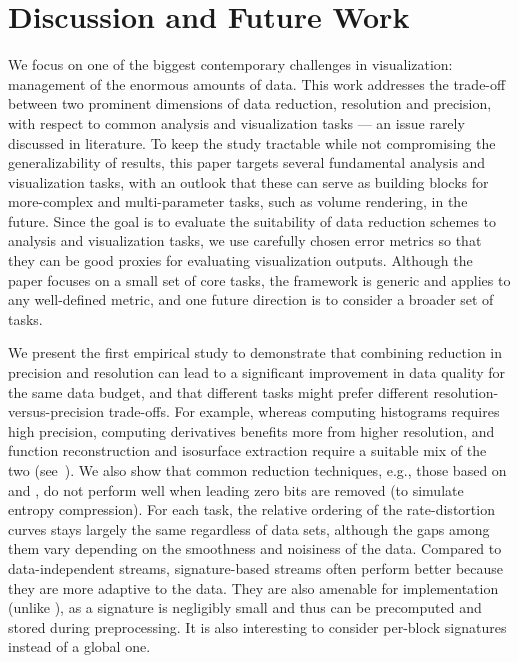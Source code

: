 \section{Discussion and Future Work}

{\color{blue}
We focus on one of the biggest contemporary challenges in visualization: management of 
the enormous amounts of data. This work addresses the trade-off between two prominent 
dimensions of data reduction, resolution and precision, with respect to 
common analysis and visualization tasks --- 
an issue rarely discussed in literature.
To keep the study tractable while not
compromising the generalizability of results, this paper targets 
several fundamental analysis and visualization tasks, with an outlook that these can serve as building blocks 
for more-complex and multi-parameter tasks, such as volume rendering, in the future.
Since the goal is to evaluate the suitability of data reduction schemes to analysis and 
visualization tasks, we use carefully chosen error metrics 
so that they can be good
proxies for evaluating visualization outputs. Although the paper focuses on a small set of core tasks, the framework is generic and applies to any well-defined metric, and one future direction is to
consider a broader set of tasks.}

We present the first empirical study to demonstrate that combining reduction in precision and
resolution can lead to a significant improvement in data quality for the same data budget, and that
different tasks might prefer different resolution-versus-precision trade-offs. For example, whereas
computing histograms requires high precision, computing derivatives benefits more from higher
resolution, and function reconstruction and isosurface extraction require a suitable mix of the two
(see~). We also show that common reduction techniques, e.g., those based on
\slvl and \smag, do not perform well when leading zero bits are removed (to simulate entropy
compression). {\color{red}For each task, the relative ordering of the rate-distortion curves stays
largely the same regardless of data sets, although the gaps among them vary depending on the
smoothness and noisiness of the data. Compared to data-independent streams, signature-based streams
often perform better because they are more adaptive to the data. They are also amenable for
implementation (unlike \sopt), as a signature is negligibly small and thus can be precomputed and
stored during preprocessing. It is also interesting to consider per-block signatures instead of a
global one.}

